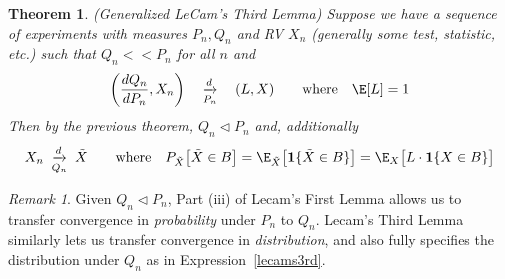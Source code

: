 \documentclass[12pt]{article}
\theoremstyle{plain}
\newtheorem{thm}{Theorem}[section]
\newtheorem{cor}[thm]{Corollary}
\theoremstyle{definition}
\theoremstyle{remark}
\newtheorem*{rmk}{Remark}
\newcommand{\dto}{\xrightarrow{d}}
\begin{document}
\begin{thm}
\label{thm:lecams3rd}
\emph{(Generalized LeCam's Third Lemma)}
Suppose we have a sequence of experiments with measures $P_n,Q_n$ and
RV $X_n$ (generally some test, statistic, etc.) such that $Q_n<<P_n$ for
all $n$ and
\begin{align*}
  \left(\frac{dQ_n}{dP_n},X_n\right)
  \quad\underset{P_n}{\dto}\quad
  (L,X)
  \qquad \text{where}\quad
  \E[L]=1
\end{align*}
Then by the previous theorem, $Q_n\vartriangleleft P_n$ and,
additionally
\begin{align}
  X_n\;\underset{Q_n}{\dto}\;\tilde{X}
  \qquad \text{where}\quad
  P_{\tilde{X}}\big[\tilde{X}\in B\big]
  = \E_{\tilde{X}}\big[\mathbf{1}\{\tilde{X}\in B\}\big]
  =\E_X\big[L\cdot \mathbf{1}\{X\in B\}\big]
  \label{lecams3rd}
\end{align}
\end{thm}
\begin{rmk}
Given $Q_n\vartriangleleft P_n$, Part (iii) of Lecam's First Lemma
allows us to transfer convergence in \emph{probability} under $P_n$ to
$Q_n$.
Lecam's Third Lemma similarly lets us transfer convergence in
\emph{distribution}, and also fully specifies the distribution under
$Q_n$ as in Expression~\ref{lecams3rd}.
\end{rmk}

\end{document}
